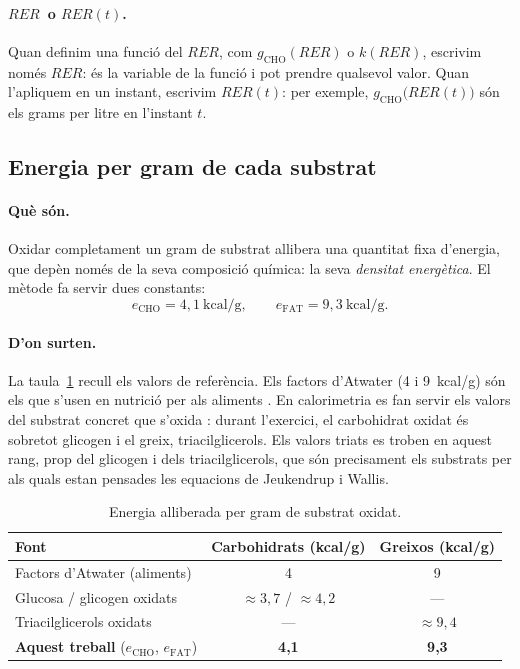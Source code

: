 \documentclass[10pt,a4paper]{article}
\newcommand{\sub}[1]{{\scriptscriptstyle\mathrm{#1}}}   %
\newcommand{\CHO}{\sub{CHO}}
\newcommand{\FAT}{\sub{FAT}}
\newcommand{\RER}{\ensuremath{\mathit{RER}}}
\newcommand{\kcal}{\ensuremath{\mathrm{kcal}}}
\begin{document}
\paragraph{\RER\ o $\RER(t)$.} Quan definim una funció del \RER, com $g_{\CHO}(\RER)$ o
$k(\RER)$, escrivim només \RER: és la variable de la funció i pot prendre qualsevol valor.
Quan l'apliquem en un instant, escrivim $\RER(t)$: per exemple, $g_{\CHO}\bigl(\RER(t)\bigr)$
són els grams per litre en l'instant $t$.

\subsection{Energia per gram de cada substrat}\label{sec:e}
\paragraph{Què són.} Oxidar completament un gram de substrat allibera una quantitat fixa
d'energia, que depèn només de la seva composició química: la seva \emph{densitat
energètica}. El mètode fa servir dues constants:
\begin{equation}
  e_{\CHO}=4{,}1~\kcal/\mathrm{g},\qquad e_{\FAT}=9{,}3~\kcal/\mathrm{g}.
  \label{eq:e}
\end{equation}

\paragraph{D'on surten.} La taula~\ref{tab:densitats} recull els valors de referència.
Els factors d'Atwater (4 i 9~kcal/g) són els que s'usen en nutrició per als aliments
\citep{atwater1900}. En calorimetria es fan servir els valors del substrat concret que
s'oxida \citep{livesey1988}: durant l'exercici, el carbohidrat oxidat és sobretot
glicogen i el greix, triacilglicerols. Els valors triats es troben en aquest rang, prop
del glicogen i dels triacilglicerols, que són precisament els substrats per als quals
estan pensades les equacions de Jeukendrup i Wallis.

\begin{table}[H]
\centering
\caption{Energia alliberada per gram de substrat oxidat.}
\label{tab:densitats}
\small
\begin{tabular}{@{}lcc@{}}
\toprule
Font & Carbohidrats (kcal/g) & Greixos (kcal/g) \\
\midrule
Factors d'Atwater (aliments) \citep{atwater1900} & 4 & 9 \\
Glucosa / glicogen oxidats \citep{livesey1988} & $\approx3{,}7$ / $\approx4{,}2$ & --- \\
Triacilglicerols oxidats \citep{livesey1988} & --- & $\approx9{,}4$ \\
\textbf{Aquest treball} ($e_{\CHO}$, $e_{\FAT}$) & \textbf{4,1} & \textbf{9,3} \\
\bottomrule
\end{tabular}
\end{table}
\end{document}
